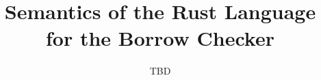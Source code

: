 \documentclass{llncs}
\begin{document}
\title{Semantics of the Rust Language for the Borrow Checker}
\author{TBD}

\maketitle

\begin{abstract}
  
\end{abstract}











\end{document}
